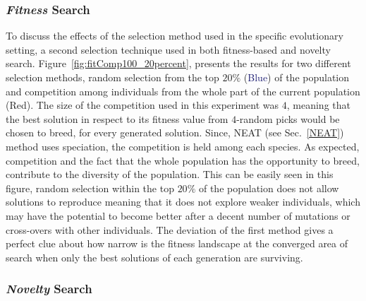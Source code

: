 \subsubsection*{\emph{Fitness} Search}

To discuss the effects of the selection method used in the specific evolutionary setting, a second selection technique used in both fitness-based and novelty search. Figure~\ref{fig:fitComp100_20percent}, presents the results for two different selection methods, random selection from the top $20\%$ (\textcolor{MidnightBlue}{Blue}) of the population and competition among individuals from the whole part of the current population (\textcolor{BrickRed}{Red}). The size of the competition used in this experiment was $4$, meaning that the best solution in respect to its fitness value from $4$-random picks would be chosen to breed, for every generated solution. Since, NEAT (see Sec.~\ref{NEAT}) method uses speciation, the competition is held among each species. As expected, competition and the fact that the whole population has the opportunity to breed, contribute to the diversity of the population. This can be easily seen in this figure, random selection within the top $20\%$ of the population does not allow solutions to reproduce meaning that it does not explore weaker individuals, which may have the potential to become better after a decent number of mutations or cross-overs with other individuals. The deviation of the first method gives a perfect clue about how narrow is the fitness landscape at the converged area of search when only the best solutions of each generation are surviving.

\subsubsection*{\emph{Novelty} Search}

